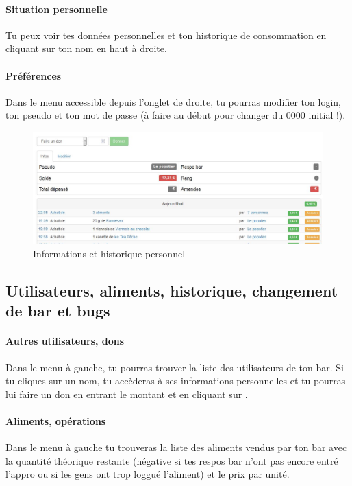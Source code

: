 \documentclass[12pt,french]{article}
\begin{document}
\paragraph{Situation personnelle} Tu peux voir tes données personnelles et ton historique de consommation en cliquant sur ton nom en haut à droite.

\paragraph{Préférences} Dans le menu  accessible depuis l'onglet de droite, tu pourras modifier ton login, ton pseudo et ton mot de passe (à faire au début pour changer du 0000 initial !).

\begin{figure}[h]
\centering
\includegraphics[width=16cm]{images/infosperso}
\caption{Informations et historique personnel}
\end{figure}

\subsection{Utilisateurs, aliments, historique, changement de bar et bugs}

\paragraph{Autres utilisateurs, dons} Dans le menu  à gauche, tu pourras trouver la liste des utilisateurs de ton bar. Si tu cliques sur un nom, tu accèderas à ses informations personnelles et tu pourras lui faire un don en entrant le montant et en cliquant sur .

\paragraph{Aliments, opérations} Dans le menu  à gauche tu trouveras la liste des aliments vendus par ton bar avec la quantité théorique restante (négative si tes respos bar n'ont pas encore entré l'appro ou si les gens ont trop loggué l'aliment) et le prix par unité.
\end{document}
